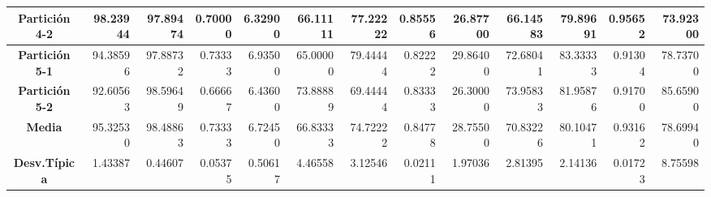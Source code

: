 \documentclass[a4paper,11pt]{article}
\begin{document}
\begin{table}[H]
\begin{adjustbox}{width=1.1\textwidth}
\begin{tabular}{|c|r|r|r|r|r|r|r|r|r|r|r|r|}
  \textbf{Partición 4-2} & 98.23944 & 97.89474 & 0.70000 & 6.32900 & 66.11111 & 77.22222 & 0.85556 & 26.87700 & 66.14583 & 79.89691 & 0.95652 & 73.92300 \\ \hline
  \textbf{Partición 5-1} & 94.38596 & 97.88732 & 0.73333 & 6.93500 & 65.00000 & 79.44444 & 0.82222 & 29.86400 & 72.68041 & 83.33333 & 0.91304 & 78.73700 \\ \hline
  \textbf{Partición 5-2} & 92.60563 & 98.59649 & 0.66667 & 6.43600 & 73.88889 & 69.44444 & 0.83333 & 26.30000 & 73.95833 & 81.95876 & 0.91700 & 85.65900 \\ \hline
  \textbf{Media} & 95.32530 & 98.48863 & 0.73333 & 6.72450 & 66.83333 & 74.72222 & 0.84778 & 28.75500 & 70.83226 & 80.10471 & 0.93162 & 78.69940 \\ \hline
  \textbf{Desv.Típica} & 1.43387 & 0.44607 & 0.05375 & 0.50617 & 4.46558 & 3.12546 & 0.02111 & 1.97036 & 2.81395 & 2.14136 & 0.01723 & 8.75598 \\ \hline
  \end{tabular}
  \end{adjustbox}
  \label{GRASP}
  \end{table}
\end{document}
